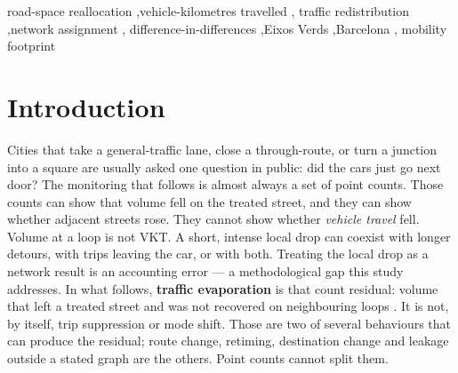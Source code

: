 \documentclass[a4paper,fleqn]{cas-dc}
\begin{document}
\begin{keywords}
road-space reallocation \sep vehicle-kilometres travelled \sep
traffic redistribution \sep network assignment \sep
difference-in-differences \sep Eixos Verds \sep Barcelona \sep
mobility footprint
\end{keywords}

\maketitle

\section{Introduction}

Cities that take a general-traffic lane, close a through-route, or turn a
junction into a square are usually asked one question in public: did the cars
just go next door? The monitoring that follows is almost always a set of point
counts. Those counts can show that volume fell on the treated street, and they
can show whether adjacent streets rose. They cannot show whether
\emph{vehicle travel} fell. Volume at a loop is not VKT. A short, intense
local drop can coexist with longer detours, with trips leaving the car, or
with both. Treating the local drop as a network result is an accounting error ---
a methodological gap this study addresses. In what follows,
\textbf{traffic evaporation} is that count residual: volume that left a
treated street and was not recovered on neighbouring loops
\citep{Cairns2002}. It is not, by itself, trip suppression or mode shift.
Those are two of several behaviours that can produce the residual; route
change, retiming, destination change and leakage outside a stated graph are
the others. Point counts cannot split them.
\end{document}
